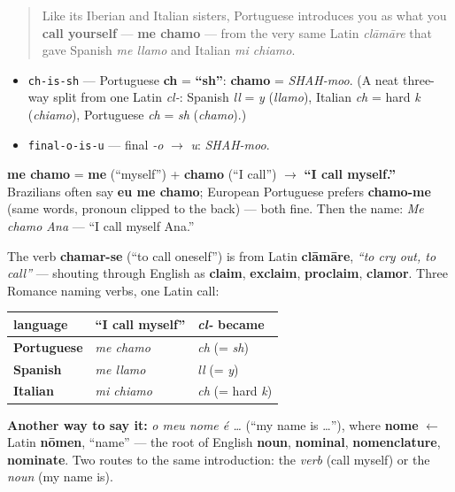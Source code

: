 \begin{quote}
Like its Iberian and Italian sisters, Portuguese introduces you as what you \textbf{call yourself} — \textbf{me chamo} — from the very same Latin \emph{clāmāre} that gave Spanish \emph{me llamo} and Italian \emph{mi chiamo}.
\end{quote}

\begin{sounds}
\begin{itemize}
\raggedright
  \item \texttt{ch-is-sh} — Portuguese \textbf{ch} = \textbf{\textquotedblleft{}sh\textquotedblright{}}: \textbf{chamo} = \emph{SHAH-moo}. (A neat three-way split from one Latin \emph{cl-}: Spanish \emph{ll} = \emph{y} (\emph{llamo}), Italian \emph{ch} = hard \emph{k} (\emph{chiamo}), Portuguese \emph{ch} = \emph{sh} (\emph{chamo}).)
  \item \texttt{final-o-is-u} — final \emph{-o} $\to$ \emph{u}: \emph{SHAH-moo}.
\end{itemize}
\end{sounds}

\begin{cousinweb}
\textbf{me chamo} = \textbf{me} (\textquotedblleft{}myself\textquotedblright{}) + \textbf{chamo} (\textquotedblleft{}I call\textquotedblright{}) $\to$ \textbf{\textquotedblleft{}I call myself.\textquotedblright{}} Brazilians often say \textbf{eu me chamo}; European Portuguese prefers \textbf{chamo-me} (same words, pronoun clipped to the back) — both fine. Then the name: \emph{Me chamo Ana} — \textquotedblleft{}I call myself Ana.\textquotedblright{}

The verb \textbf{chamar-se} (\textquotedblleft{}to call oneself\textquotedblright{}) is from Latin \textbf{clāmāre}, \emph{\textquotedblleft{}to cry out, to call\textquotedblright{}} — shouting through English as \textbf{claim}, \textbf{exclaim}, \textbf{proclaim}, \textbf{clamor}. Three Romance naming verbs, one Latin call:

\noindent
\begin{tabularx}{\linewidth}{@{}>{\raggedright\arraybackslash}X>{\raggedright\arraybackslash}X>{\raggedright\arraybackslash}X@{}}
\toprule
\textbf{language} & \textbf{\textquotedblleft{}I call myself\textquotedblright{}} & \textbf{\emph{cl-} became} \\
\midrule
\textbf{Portuguese} & \emph{me chamo} & \emph{ch} (= \emph{sh}) \\
\textbf{Spanish} & \emph{me llamo} & \emph{ll} (= \emph{y}) \\
\textbf{Italian} & \emph{mi chiamo} & \emph{ch} (= hard \emph{k}) \\
\bottomrule
\end{tabularx}

\textbf{Another way to say it:} \emph{o meu nome é …} (\textquotedblleft{}my name is …\textquotedblright{}), where \textbf{nome} $\leftarrow$ Latin \textbf{nōmen}, \textquotedblleft{}name\textquotedblright{} — the root of English \textbf{noun}, \textbf{nominal}, \textbf{nomenclature}, \textbf{nominate}. Two routes to the same introduction: the \emph{verb} (call myself) or the \emph{noun} (my name is).
\end{cousinweb}

